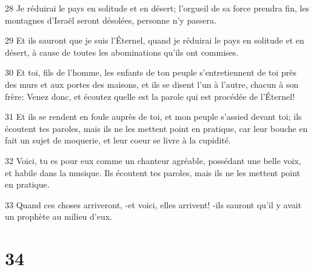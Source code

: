 \par 28 Je réduirai le pays en solitude et en désert; l'orgueil de sa force prendra fin, les montagnes d'Israël seront désolées, personne n'y passera.
\par 29 Et ils sauront que je suis l'Éternel, quand je réduirai le pays en solitude et en désert, à cause de toutes les abominations qu'ils ont commises.
\par 30 Et toi, fils de l'homme, les enfants de ton peuple s'entretiennent de toi près des murs et aux portes des maisons, et ils se disent l'un à l'autre, chacun à son frère: Venez donc, et écoutez quelle est la parole qui est procédée de l'Éternel!
\par 31 Et ils se rendent en foule auprès de toi, et mon peuple s'assied devant toi; ils écoutent tes paroles, mais ils ne les mettent point en pratique, car leur bouche en fait un sujet de moquerie, et leur coeur se livre à la cupidité.
\par 32 Voici, tu es pour eux comme un chanteur agréable, possédant une belle voix, et habile dans la musique. Ils écoutent tes paroles, mais ils ne les mettent point en pratique.
\par 33 Quand ces choses arriveront, -et voici, elles arrivent! -ils sauront qu'il y avait un prophète au milieu d'eux.

\chapter{34}

